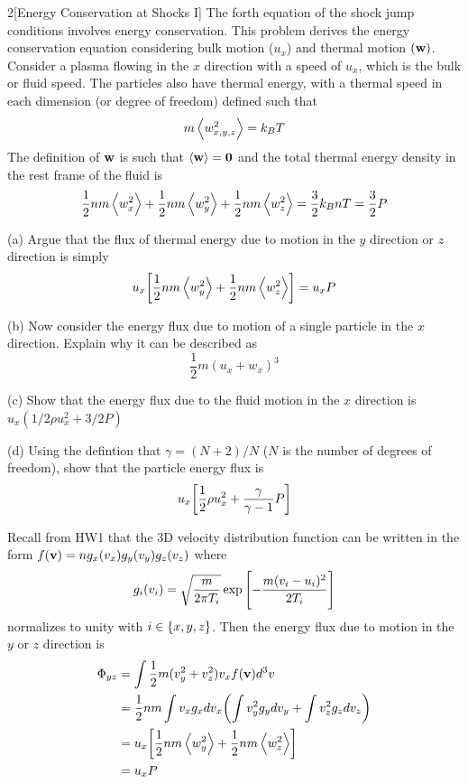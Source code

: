 \documentclass[12pt]{article}
\begin{document}
\begin{problem}{2}[Energy Conservation at Shocks I]
The forth equation of the shock jump conditions involves energy conservation.
This problem derives the energy conservation equation considering bulk motion
($u_x$) and thermal motion $(\vb{w})$. Consider a plasma flowing in the $x$
direction with a speed of $u_x$, which is the bulk or fluid speed. The particles
also have thermal energy, with a thermal speed in each dimension (or degree of
freedom) defined such that
\begin{equation}
    m\expval{w_{x,y,z}^2}=k_BT 
\end{equation}
The definition of $\vb{w}$ is such that $\expval{\vb{w}}=\vb{0}$ and the total
thermal energy density in the rest frame of the fluid is
\begin{equation}\label{p2:thermalE}
    \frac12nm\expval{w_x^2}+\frac12nm\expval{w_y^2}+\frac12nm\expval{w_z^2}
    =\frac32k_BnT=\frac32P
\end{equation}

(a) Argue that the flux of thermal energy due to motion in the $y$ direction or
$z$ direction is simply
\begin{equation}
    u_x\qty[\frac12nm\expval{w_y^2}+\frac12nm\expval{w_z^2}]
    =u_xP
\end{equation}

(b) Now consider the energy flux due to motion of a single particle in the $x$
direction. Explain why it can be described as
\begin{equation}
    \frac12m(u_x+w_x)^3 
\end{equation}

(c) Show that the energy flux due to the fluid motion in the $x$ direction is
$u_x(1 /2\rho u_x^2+3 /2P)$

(d) Using the defintion that $\gamma=(N+2) /N$ ($N$ is the number of degrees of
freedom), show that the particle energy flux is
\begin{equation}
    u_x\qty[\frac12\rho u_x^2+\frac{\gamma}{\gamma-1}P] 
\end{equation}
\begin{solution}
Recall from HW1 that the 3D velocity distribution function can be written in the
form $f(\vb{v})=ng_x(v_x)g_y(v_y)g_z(v_z)$ where
\begin{equation}
    g_i(v_i)=\sqrt{\frac{m}{2\pi T_i}}\exp\qty[-\frac{m(v_i-u_i)^2}{2T_i}]
\end{equation}
normalizes to unity with $i\in\qty{x,y,z}$. Then the energy flux due to motion 
in the $y$ or $z$ direction is
\begin{align}
    \Phi_{yz}
    &=\int \frac12m(v_y^2+v_z^2)v_xf(\vb{v})d^3v\notag\\
    &=\frac12nm\int v_xg_xdv_x\qty(\int v_y^2g_ydv_y+\int v_z^2g_zdv_z)\notag\\
    &=u_x\qty[\frac12nm\expval{w_y^2}+\frac12nm\expval{w_z^2}]\notag\\
    &=u_xP
\end{align}


\end{solution}
\end{problem}
\end{document}
